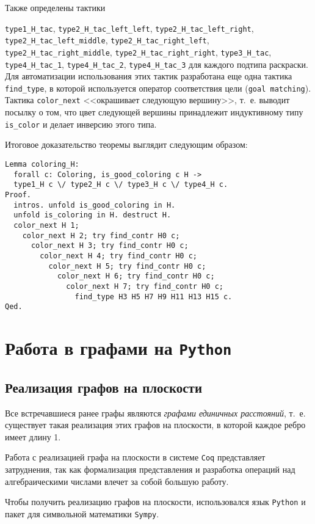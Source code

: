 Также определены тактики 

{\tt type1\_H\_tac}, {\tt type2\_H\_tac\_left\_left}, {\tt type2\_H\_tac\_left\_right}, {\tt type2\_H\_tac\_left\_middle}, {\tt type2\_H\_tac\_right\_left}, {\tt type2\_H\_tac\_right\_middle}, {\tt type2\_H\_tac\_right\_right}, {\tt type3\_H\_tac}, {\tt type4\_H\_tac\_1}, {\tt type4\_H\_tac\_2}, {\tt type4\_H\_tac\_3} для каждого подтипа раскраски. Для автоматизации использования этих тактик разработана еще одна тактика {\tt find\_type}, в которой используется оператор соответствия цели ({\tt goal matching}). Тактика {\tt color\_next} <<окрашивает следующую вершину>>, т.~е. выводит посылку о том, что цвет следующей вершины принадлежит индуктивному типу {\tt is\_color} и делает инверсию этого типа.

Итоговое доказательство теоремы выглядит следующим образом:

\begin{verbatim}
Lemma coloring_H:
  forall c: Coloring, is_good_coloring c H ->
  type1_H c \/ type2_H c \/ type3_H c \/ type4_H c.
Proof.
  intros. unfold is_good_coloring in H. 
  unfold is_coloring in H. destruct H.
  color_next H 1;
    color_next H 2; try find_contr H0 c;
      color_next H 3; try find_contr H0 c;
        color_next H 4; try find_contr H0 c;
          color_next H 5; try find_contr H0 c;
            color_next H 6; try find_contr H0 c;
              color_next H 7; try find_contr H0 c;
                find_type H3 H5 H7 H9 H11 H13 H15 c.
Qed.
\end{verbatim}

\chapter{Работа в графами на {\tt Python}}
\section{Реализация графов на плоскости}
Все встречавшиеся ранее графы являются {\it графами единичных расстояний}, т.~е. существует такая реализация этих графов на плоскости, в которой каждое ребро имеет длину 1.

Работа с реализацией графа на плоскости в системе {\tt Coq} представляет затруднения, так как формализация представления и разработка операций над алгебраическими числами влечет за собой большую работу.

Чтобы получить реализацию графов на плоскости, использовался язык {\tt Python} и пакет для символьной математики {\tt Sympy}.

